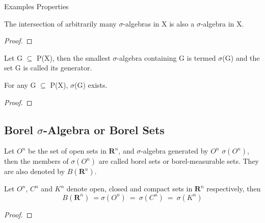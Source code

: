 Examples
Properties
\begin{theorem}
    The intersection of arbitrarily many $\sigma$-algebras in X is also a
    $\sigma$-algebra in X.
\end{theorem}
\begin{proof}
\end{proof}
\begin{definition}
    Let G $\subseteq$ P(X), then the smallest $\sigma$-algebra containing G is
    termed $\sigma$(G) and the set G is called its generator.
\end{definition}
\begin{theorem}
    For any G $\subseteq$ P(X), $\sigma$(G) exists.
\end{theorem}
\begin{proof}
\end{proof}

\subsection{Borel $\sigma$-Algebra or Borel Sets}
\begin{definition}
    Let $O^n$ be the set of open sets in $\bm{R}^n$, and  $\sigma$-algebra
    generated by $O^n$ $\sigma(O^n)$, then the members of $\sigma(O^n)$ are
    called borel sets or borel-measurable sets. They are also denoted by
    $B(\bm{R}^n)$.
\end{definition}
\begin{theorem}
    Let $O^n$, $C^n$ and $K^n$ denote open, closed and compact sets in
    $\bm{R}^n$ respectively, then
    \[
        B(\bm{R}^n) \: = \sigma(O^n) \: = \: \sigma(C^n) \: = \: \sigma(K^n)
    \]
\end{theorem}
\begin{proof}
\end{proof}

